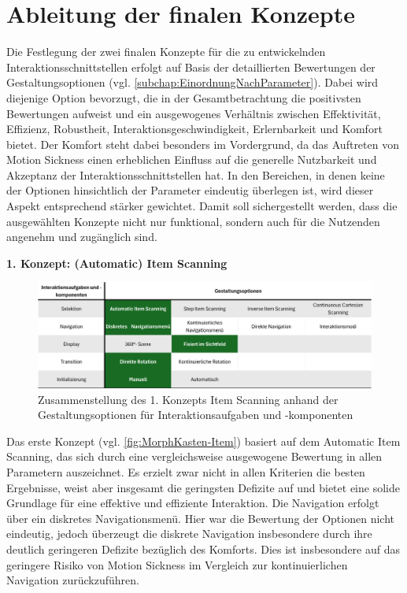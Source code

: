 \section{Ableitung der finalen Konzepte}

Die Festlegung der zwei finalen Konzepte für die zu entwickelnden Interaktionsschnittstellen erfolgt auf Basis der detaillierten Bewertungen der Gestaltungsoptionen (vgl. \autoref{subchap:EinordnungNachParameter}). Dabei wird diejenige Option bevorzugt, die in der Gesamtbetrachtung die positivsten Bewertungen aufweist und ein ausgewogenes Verhältnis zwischen Effektivität, Effizienz, Robustheit, Interaktionsgeschwindigkeit, Erlernbarkeit und Komfort bietet.
Der Komfort steht dabei besonders im Vordergrund, da das Auftreten von Motion Sickness einen erheblichen Einfluss auf die generelle Nutzbarkeit und Akzeptanz der Interaktionsschnittstellen hat. In den Bereichen, in denen keine der Optionen hinsichtlich der Parameter eindeutig überlegen ist, wird dieser Aspekt entsprechend stärker gewichtet. Damit soll sichergestellt werden, dass die ausgewählten Konzepte nicht nur funktional, sondern auch für die Nutzenden angenehm und zugänglich sind.


{\normalfont \bfseries 1. Konzept: (Automatic) Item Scanning} 

\begin{figure}[tbh]
    \centering
    \includegraphics[width=1.0\textwidth]{images/MorphKasten-Item.png}
    \caption{Zusammenstellung des 1. Konzepts Item Scanning anhand der Gestaltungsoptionen für Interaktionsaufgaben und -komponenten}
    \label{fig:MorphKasten-Item}
\end{figure}

Das erste Konzept (vgl. \autoref{fig:MorphKasten-Item}) basiert auf dem Automatic Item Scanning, das sich durch eine vergleichsweise ausgewogene Bewertung in allen Parametern auszeichnet. Es erzielt zwar nicht in allen Kriterien die besten Ergebnisse, weist aber insgesamt die geringsten Defizite auf und bietet eine solide Grundlage für eine effektive und effiziente Interaktion. Die Navigation erfolgt über ein diskretes Navigationsmenü. Hier war die Bewertung der Optionen nicht eindeutig, jedoch überzeugt die diskrete Navigation insbesondere durch ihre deutlich geringeren Defizite bezüglich des Komforts. Dies ist insbesondere auf das geringere Risiko von Motion Sickness im Vergleich zur kontinuierlichen Navigation zurückzuführen.

